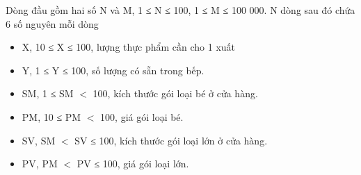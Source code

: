 Dòng đầu gồm hai số N và M, 1 ≤ N ≤ 100, 1 ≤ M ≤ 100 000. N dòng sau đó chứa 6 số nguyên mỗi dòng
\begin{itemize}
	\item X, 10 ≤ X ≤ 100, lượng thực phẩm cần cho 1 xuất
	\item Y, 1 ≤ Y ≤ 100, số lượng có sẵn trong bếp.
	\item SM, 1 ≤ SM $<$ 100, kích thước gói loại bé ở cửa hàng.
	\item PM, 10 ≤ PM $<$ 100, giá gói loại bé.
	\item SV, SM $<$ SV ≤ 100, kích thước gói loại lớn ở cửa hàng.
	\item PV, PM $<$ PV ≤ 100, giá gói loại lớn.
\end{itemize}
